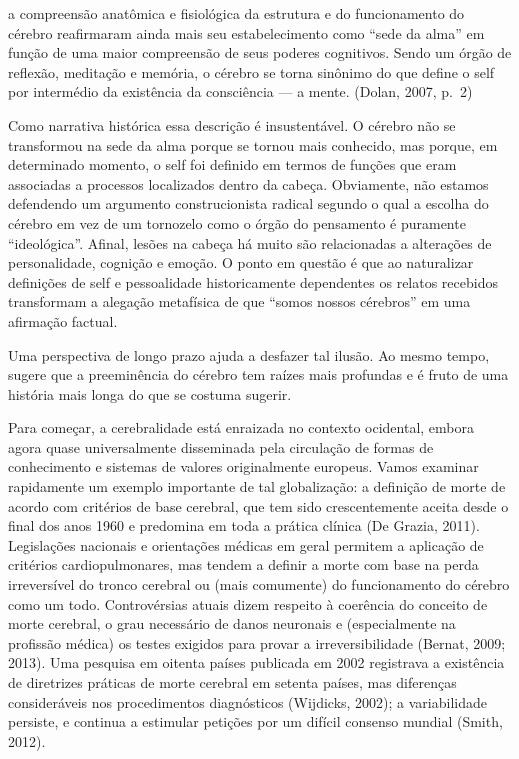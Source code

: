 a compreensão anatômica e fisiológica da estrutura e do funcionamento do
cérebro reafirmaram ainda mais seu estabelecimento como ``sede da alma''
em função de uma maior compreensão de seus poderes cognitivos. Sendo um
órgão de reflexão, meditação e memória, o cérebro se torna sinônimo do
que define o self por intermédio da existência da consciência --- a
mente. (Dolan, 2007, p.~2)

Como narrativa histórica essa descrição é insustentável. O cérebro não
se transformou na sede da alma porque se tornou mais conhecido, mas
porque, em determinado momento, o self foi definido em termos de funções
que eram associadas a processos localizados dentro da cabeça.
Obviamente, não estamos defendendo um argumento construcionista radical
segundo o qual a escolha do cérebro em vez de um tornozelo como o órgão
do pensamento é puramente ``ideológica''. Afinal, lesões na cabeça há
muito são relacionadas a alterações de personalidade, cognição e emoção.
O ponto em questão é que ao naturalizar definições de self e
pessoalidade historicamente dependentes os relatos recebidos transformam
a alegação metafísica de que ``somos nossos cérebros'' em uma afirmação
factual.

Uma perspectiva de longo prazo ajuda a desfazer tal ilusão. Ao mesmo
tempo, sugere que a preeminência do cérebro tem raízes mais profundas e
é fruto de uma história mais longa do que se costuma sugerir.

Para começar, a cerebralidade está enraizada no contexto ocidental,
embora agora quase universalmente disseminada pela circulação de formas
de conhecimento e sistemas de valores originalmente europeus. Vamos
examinar rapidamente um exemplo importante de tal globalização: a
definição de morte de acordo com critérios de base cerebral, que tem
sido crescentemente aceita desde o final dos anos 1960 e predomina em
toda a prática clínica (De Grazia, 2011). Legislações nacionais e
orientações médicas em geral permitem a aplicação de critérios
cardiopulmonares, mas tendem a definir a morte com base na perda
irreversível do tronco cerebral ou (mais comumente) do funcionamento do
cérebro como um todo. Controvérsias atuais dizem respeito à coerência do
conceito de morte cerebral, o grau necessário de danos neuronais e
(especialmente na profissão médica) os testes exigidos para provar a
irreversibilidade (Bernat, 2009; 2013). Uma pesquisa em oitenta países
publicada em 2002 registrava a existência de diretrizes práticas de
morte cerebral em setenta países, mas diferenças consideráveis nos
procedimentos diagnósticos (Wijdicks, 2002); a variabilidade persiste, e
continua a estimular petições por um difícil consenso mundial (Smith,
2012).

